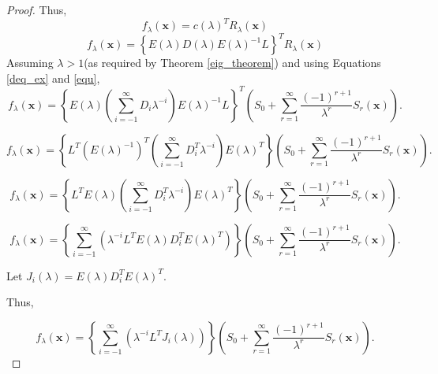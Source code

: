 \documentclass[multixcb]{amstext-l}
\theoremstyle{plain}
\theoremstyle{definition}
\theoremstyle{definition}
\theoremstyle{remark}
\numberwithin{equation}{chapter}
\begin{document}
\begin{proof}
 Thus, \begin{equation}\label{eq52}f_{\lambda}(\boldsymbol{x}) = c(\lambda)^TR_{\lambda}(\boldsymbol{x})\end{equation}
 \begin{equation}\label{eq55}f_{\lambda}(\boldsymbol{x}) = \left\{E(\lambda)D(\lambda)E(\lambda)^{-1}L \right\}^T R_{\lambda}(\boldsymbol{x}) \end{equation}
Assuming $\lambda>1$(as required by Theorem \ref{eig_theorem}) and using Equations \ref{deq_ex} and \ref{equ},
\begin{equation}\label{eq55_ex}f_{\lambda}(\boldsymbol{x}) = \left\{E(\lambda)\left(\sum_{i=-1}^{\infty}D_{i}\lambda^{-i}\right)E(\lambda)^{-1}L \right\}^T \left( S_0 + \sum\limits_{r=1}^{\infty}\frac{(-1)^{r+1}}{\lambda^r}S_r(\boldsymbol{x})  \right). \end{equation}
 
 \begin{equation}\label{eq56}f_{\lambda}(\boldsymbol{x}) = \left\{L^T  (E(\lambda)^{-1})^T\left(\sum_{i=-1}^{\infty}D_{i}^T\lambda^{-i}\right)E(\lambda)^{T} \right\} \left( S_0 + \sum\limits_{r=1}^{\infty}\frac{(-1)^{r+1}}{\lambda^r}S_r(\boldsymbol{x})  \right). \end{equation}
 
 \begin{equation}\label{eq57}f_{\lambda}(\boldsymbol{x}) = \left\{L^T  E(\lambda)\left(\sum_{i=-1}^{\infty}D_{i}^T\lambda^{-i}\right)E(\lambda)^{T} \right\} \left( S_0 + \sum\limits_{r=1}^{\infty}\frac{(-1)^{r+1}}{\lambda^r}S_r(\boldsymbol{x}) \right). \end{equation}
 
 \begin{equation}\label{eq58}f_{\lambda}(\boldsymbol{x}) = \left\{  \sum_{i=-1}^{\infty}\left(\lambda^{-i}L^TE(\lambda)D_{i}^TE(\lambda)^{T}\right) \right\} \left(S_0 + \sum\limits_{r=1}^{\infty}\frac{(-1)^{r+1}}{\lambda^r}S_r(\boldsymbol{x})  \right). \end{equation}
 
 Let $J_i(\lambda) = E(\lambda)D_{i}^TE(\lambda)^{T}.$
 
 Thus,
 
 \begin{equation}\label{eq59}f_{\lambda}(\boldsymbol{x}) = \left\{  \sum_{i=-1}^{\infty}\left(\lambda^{-i}L^TJ_i(\lambda)\right) \right\} \left( S_0 + \sum\limits_{r=1}^{\infty}\frac{(-1)^{r+1}}{\lambda^r}S_r(\boldsymbol{x})  \right). \end{equation}
 

\end{proof}
\end{document}
